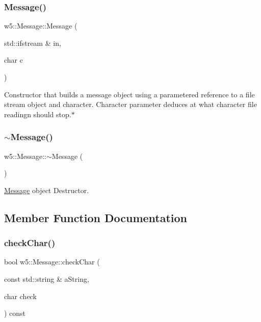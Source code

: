 \subsubsection{\texorpdfstring{Message()}{Message()}\hspace{0.1cm}{\footnotesize\ttfamily [2/2]}}
{\footnotesize\ttfamily w5\+::\+Message\+::\+Message (\begin{DoxyParamCaption}\item[{std\+::ifstream \&}]{in,  }\item[{char}]{c }\end{DoxyParamCaption})}

Constructor that builds a message object using a parametered reference to a file stream object and character. Character parameter deduces at what character file readingn should stop.$\ast$ \mbox{\label{classw5_1_1Message_a0d60457824644d8286e4805c04ebe193}} 
\subsubsection{\texorpdfstring{$\sim$\+Message()}{~Message()}}
{\footnotesize\ttfamily w5\+::\+Message\+::$\sim$\+Message (\begin{DoxyParamCaption}{ }\end{DoxyParamCaption})}

\mbox{\hyperlink{classw5_1_1Message}{Message}} object Destructor. 

\subsection{Member Function Documentation}
\mbox{\label{classw5_1_1Message_acb21bb76b2afdb4e58823f8cf20ad762}} 
\subsubsection{\texorpdfstring{check\+Char()}{checkChar()}}
{\footnotesize\ttfamily bool w5\+::\+Message\+::check\+Char (\begin{DoxyParamCaption}\item[{const std\+::string \&}]{a\+String,  }\item[{char}]{check }\end{DoxyParamCaption}) const}

